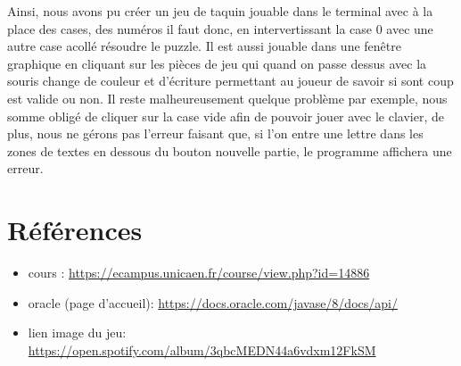 \documentclass[12pt]{article}
\begin{document}
Ainsi, nous avons pu créer un jeu de taquin jouable dans le terminal avec à la place des cases, des numéros il faut donc, en intervertissant la case 0 avec une autre case acollé résoudre le puzzle. Il est aussi jouable dans une fenêtre graphique en cliquant sur les pièces de jeu qui quand on passe dessus avec la souris change de couleur et d'écriture permettant au joueur de savoir si sont coup est valide ou non. Il reste malheureusement quelque problème par exemple, nous somme obligé de cliquer sur la case vide afin de pouvoir jouer avec le clavier, de plus, nous ne gérons pas l'erreur faisant que, si l'on entre une lettre dans les zones de textes en dessous du bouton nouvelle partie, le programme affichera une erreur.

\section*{Références}

\begin{itemize}
\item cours : \url{https://ecampus.unicaen.fr/course/view.php?id=14886}
\item oracle (page d'accueil): \url{https://docs.oracle.com/javase/8/docs/api/}
\item lien image du jeu: \url{https://open.spotify.com/album/3qbcMEDN44a6vdxm12FkSM}
\end{itemize}
\end{document}
